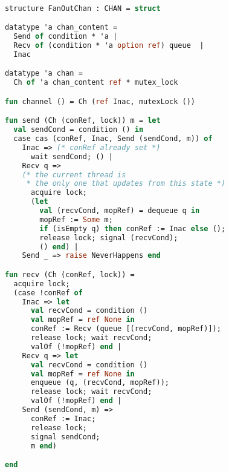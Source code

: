\documentclass{article}
\begin{document}
    \begin{lstlisting}[language=ML, style=codestyle1]

      structure FanOutChan : CHAN = struct

      datatype 'a chan_content =
        Send of condition * 'a |
        Recv of (condition * 'a option ref) queue  |
        Inac

      datatype 'a chan =
        Ch of 'a chan_content ref * mutex_lock

      fun channel () = Ch (ref Inac, mutexLock ())

      fun send (Ch (conRef, lock)) m = let
        val sendCond = condition () in
        case cas (conRef, Inac, Send (sendCond, m)) of
          Inac => (* conRef already set *)
            wait sendCond; () |
          Recv q => 
          (* the current thread is
           * the only one that updates from this state *)
            acquire lock;
            (let
              val (recvCond, mopRef) = dequeue q in
              mopRef := Some m; 
              if (isEmpty q) then conRef := Inac else (); 
              release lock; signal (recvCond);
              () end) |
          Send _ => raise NeverHappens end

      fun recv (Ch (conRef, lock)) =
        acquire lock;
        (case !conRef of
          Inac => let
            val recvCond = condition ()
            val mopRef = ref None in
            conRef := Recv (queue [(recvCond, mopRef)]);
            release lock; wait recvCond;
            valOf (!mopRef) end |
          Recv q => let
            val recvCond = condition () 
            val mopRef = ref None in
            enqueue (q, (recvCond, mopRef));
            release lock; wait recvCond;
            valOf (!mopRef) end |
          Send (sendCond, m) =>
            conRef := Inac;
            release lock;
            signal sendCond;
            m end) 

      end 
    \end{lstlisting}
\end{document}
